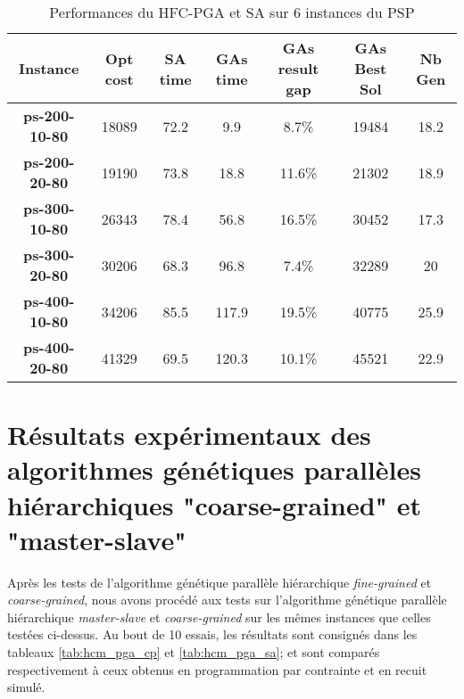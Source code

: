	\begin{table}[h]
		\centering
		\begin{tabular}{|c|c|c|c|c|c|c|}
			\hline
			\textbf{Instance} & \textbf{Opt cost} & \textbf{SA time} & \textbf{GAs time} & \textbf{GAs result gap} & \textbf{GAs Best Sol} & \textbf{Nb Gen}\\
			\hline
			\textbf{ps-200-10-80} & 18089 & 72.2 & 9.9 & 8.7\% & 19484 & 18.2 \\
			\textbf{ps-200-20-80} & 19190 & 73.8 & 18.8 & 11.6\% & 21302 & 18.9 \\
			\textbf{ps-300-10-80} & 26343 & 78.4 & 56.8 & 16.5\% & 30452 & 17.3 \\
			\textbf{ps-300-20-80} & 30206 & 68.3 & 96.8 & 7.4\% & 32289 & 20 \\
			\textbf{ps-400-10-80} & 34206 & 85.5 & 117.9 & 19.5\% & 40775 & 25.9 \\
			\textbf{ps-400-20-80} & 41329 & 69.5 & 120.3 & 10.1\% & 45521 & 22.9 \\
			\hline
		\end{tabular}	
		\caption{Performances du HFC-PGA et SA sur 6 instances du PSP}
		\label{tab:hfc_pga_sa}	
	\end{table}			
		
		\section{Résultats expérimentaux des algorithmes génétiques parallèles hiérarchiques "coarse-grained" et "master-slave"}
		
		Après les tests de l'algorithme génétique parallèle hiérarchique \emph{fine-grained} et \emph{coarse-grained}, nous avons procédé aux tests sur l'algorithme génétique parallèle hiérarchique \emph{master-slave} et \emph{coarse-grained} sur les mêmes instances que celles testées ci-dessus. Au bout de 10 essais, les résultats sont consignés dans les tableaux \ref{tab:hcm_pga_cp}  et \ref{tab:hcm_pga_sa}; et sont comparés respectivement à ceux obtenus en programmation par contrainte et en recuit simulé.
		
